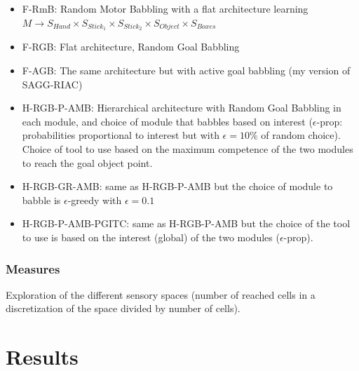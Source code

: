 \documentclass[10pt,letterpaper]{article}
\begin{document}
			\begin{itemize}
			
				\item F-RmB: Random Motor Babbling with a flat architecture learning $M \rightarrow S_{Hand} \times S_{Stick_1} \times S_{Stick_2} \times S_{Object} \times S_{Boxes}$
				\item F-RGB: Flat architecture, Random Goal Babbling
				\item F-AGB: The same architecture but with active goal babbling (my version of SAGG-RIAC)
				\item H-RGB-P-AMB: Hierarchical architecture with Random Goal Babbling in each module, and choice of module that babbles based on interest ($\epsilon$-prop: probabilities proportional to interest but with $\epsilon=10\%$ of random choice). Choice of tool to use based on the maximum competence of the two modules to reach the goal object point.
				\item H-RGB-GR-AMB: same as H-RGB-P-AMB but the choice of module to babble is $\epsilon$-greedy with $\epsilon=0.1$
				\item H-RGB-P-AMB-PGITC: same as H-RGB-P-AMB but the choice of the tool to use is based on the interest (global) of the two modules ($\epsilon$-prop).

			\end{itemize}
				
		
		\subsubsection{Measures}
			
			Exploration of the different sensory spaces (number of reached cells in a discretization of the space divided by number of cells).
			
		
	
%


\section{Results}
	
\end{document}
